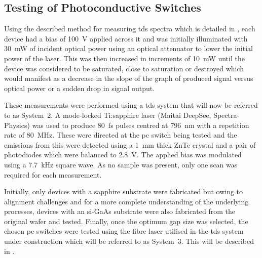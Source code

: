 \subsection{Testing of Photoconductive Switches}
Using the described method for measuring \acrshort{tds} spectra which is detailed in , each device had a bias of \SI{100}{V} applied across it and was initially illuminated with \SI{30}{mW} of incident optical power using an optical attenuator to lower the initial power of the laser. This was then increased in increments of \SI{10}{mW} until the device was considered to be saturated, close to saturation or destroyed which would manifest as a decrease in the slope of the graph of produced signal versus optical power or a sudden drop in signal output. 
\DIFdelbegin {}\DIFdelend 

These measurements were performed using a \acrshort{tds} system that will now be referred to as System~2. A mode\nobreakdash-locked Ti:sapphire laser (Maitai DeepSee, Spectra\nobreakdash-Physics) was used to produce \SI{80}{fs} pulses centred at \SI{796}{nm} with a repetition rate of \SI{80}{MHz}. These were directed at the \acrshort{pc} switch being tested and the emissions from this were detected using a \SI{1}{mm} thick ZnTe crystal and a pair of photodiodes which were balanced to \SI{2.8}{V}. The applied bias was modulated using a \SI{7.7}{kHz} square wave. As no sample was present, only one scan was required for each measurement.

Initially, only devices with a sapphire substrate were fabricated but owing to alignment challenges and for a more complete understanding of the underlying processes, devices with an \acrshort{si}\nobreakdash-GaAs substrate were also fabricated from the original wafer and tested. Finally, once the optimum gap size was selected, the chosen \acrshort{pc} switches were tested using the fibre laser utilised in the \acrshort{tds} system under construction which will be referred to as System~3. This will be described in .

